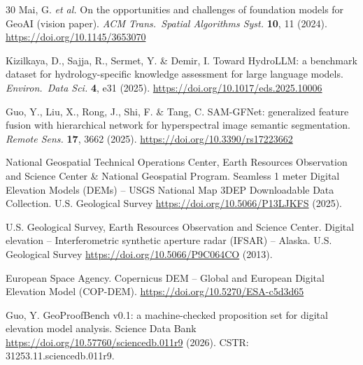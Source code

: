 \documentclass[11pt,a4paper]{article}
\begin{document}
\begin{thebibliography}{30}
Mai, G. \textit{et al.} On the opportunities and challenges of foundation models for GeoAI (vision paper).
\textit{ACM Trans.\ Spatial Algorithms Syst.} \textbf{10}, 11 (2024).
\url{https://doi.org/10.1145/3653070}

Kizilkaya, D., Sajja, R., Sermet, Y. \& Demir, I.
Toward HydroLLM: a benchmark dataset for hydrology-specific knowledge assessment for large language models.
\textit{Environ.\ Data Sci.} \textbf{4}, e31 (2025).
\url{https://doi.org/10.1017/eds.2025.10006}

Guo, Y., Liu, X., Rong, J., Shi, F. \& Tang, C.
SAM-GFNet: generalized feature fusion with hierarchical network for hyperspectral image semantic segmentation.
\textit{Remote Sens.} \textbf{17}, 3662 (2025).
\url{https://doi.org/10.3390/rs17223662}

National Geospatial Technical Operations Center, Earth Resources Observation and Science Center \& National Geospatial Program.
Seamless 1 meter Digital Elevation Models (DEMs) -- USGS National Map 3DEP Downloadable Data Collection.
U.S. Geological Survey \url{https://doi.org/10.5066/P13LJKFS} (2025).

U.S. Geological Survey, Earth Resources Observation and Science Center.
Digital elevation -- Interferometric synthetic aperture radar (IFSAR) -- Alaska.
U.S. Geological Survey \url{https://doi.org/10.5066/P9C064CO} (2013).

European Space Agency. Copernicus DEM -- Global and European Digital Elevation Model (COP-DEM).
\url{https://doi.org/10.5270/ESA-c5d3d65}

Guo, Y. GeoProofBench v0.1: a machine-checked proposition set for digital elevation model analysis.
Science Data Bank \url{https://doi.org/10.57760/sciencedb.011r9} (2026).
CSTR: 31253.11.sciencedb.011r9.

\end{thebibliography}
\end{document}

